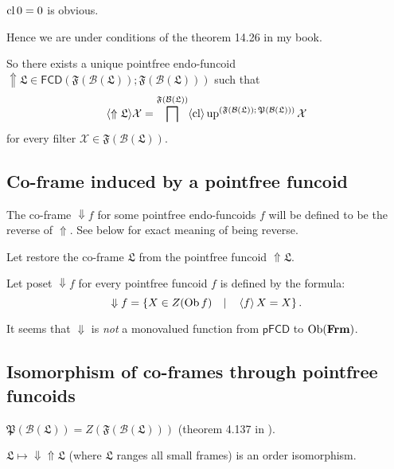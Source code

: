 $\operatorname{cl} 0 = 0$ is obvious.

Hence we are under conditions of the theorem 14.26 in my book.

So there exists a unique pointfree endo-funcoid $\Uparrow \mathfrak{L} \in
\mathsf{FCD} (\mathfrak{F} (\mathcal{B} (\mathfrak{L})) ; \mathfrak{F}
(\mathcal{B} (\mathfrak{L})))$ such that
\[ \langle \Uparrow \mathfrak{L} \rangle \mathcal{X} = \bigsqcap^{\mathfrak{F}
   (\mathcal{B} (\mathfrak{L}))} \langle \operatorname{cl} \rangle
   \operatorname{up}^{\text{$(\mathfrak{F} (\mathcal{B} (\mathfrak{L})) ; \mathfrak{P}
   (\mathcal{B} (\mathfrak{L})))$}}  \mathcal{X} \]
for every filter $\mathcal{X} \in \mathfrak{F} (\mathcal{B} (\mathfrak{L}))$.

\subsection{Co-frame induced by a pointfree funcoid}

The co-frame $\Downarrow f$ for some pointfree endo-funcoids $f$ will be
defined to be the reverse of $\Uparrow$. See below for exact meaning of being
reverse.

Let restore the co-frame $\mathfrak{L}$ from the pointfree funcoid $\Uparrow
\mathfrak{L}$.

Let poset $\Downarrow f$ for every pointfree funcoid $f$ is defined by the
formula:
\[ \Downarrow f = \left\{ X \in Z (\operatorname{Ob} f) \hspace{1em} | \hspace{1em}
   \left\langle f\right\rangle X = X \right\} . \]
\begin{rem}
  It seems that $\Downarrow$ is \emph{not} a monovalued function from
  $\mathsf{pFCD}$ to $\operatorname{Ob} (\mathbf{Frm})$.
\end{rem}

\subsection{Isomorphism of co-frames through pointfree funcoids}

\begin{rem}
  $\mathfrak{P} (\mathcal{B} (\mathfrak{L})) = Z (\mathfrak{F} (\mathcal{B}
  (\mathfrak{L})))$ (theorem 4.137 in {\cite{volume-1}}).
\end{rem}

\begin{thm}
  $\mathfrak{L} \mapsto \Downarrow \Uparrow \mathfrak{L}$ (where
  $\mathfrak{L}$ ranges all small frames) is an order isomorphism.
\end{thm}

